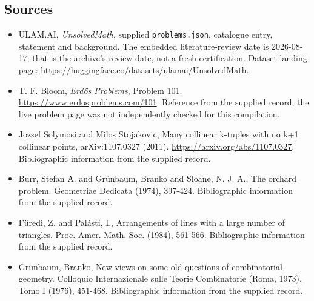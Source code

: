\documentclass[11pt,a4paper]{article}
\begin{document}
\subsection{Sources}

{\small

\begin{itemize}

\item[\hypertarget{source:statement:1}{S1}] ULAM.AI, \emph{UnsolvedMath}, supplied \texttt{problems.json}, catalogue entry, statement and background. The embedded literature-review date is 2026-08-17; that is the archive’s review date, not a fresh certification. Dataset landing page: \url{https://huggingface.co/datasets/ulamai/UnsolvedMath}.

\item[\hypertarget{source:statement:2}{S2}] T. F. Bloom, \emph{Erdős Problems}, Problem 101, \url{https://www.erdosproblems.com/101}. Reference from the supplied record; the live problem page was not independently checked for this compilation.

\item[\hypertarget{source:statement:3}{S3}] Jozsef Solymosi and Milos Stojakovic, Many collinear k-tuples with no k+1 collinear points, arXiv:1107.0327 (2011). \url{https://arxiv.org/abs/1107.0327}. Bibliographic information from the supplied record.

\item[\hypertarget{source:statement:4}{S4}] Burr, Stefan A. and Gr\"{u}nbaum, Branko and Sloane, N. J. A., The orchard problem. Geometriae Dedicata (1974), 397-424. Bibliographic information from the supplied record.

\item[\hypertarget{source:statement:5}{S5}] F\"{u}redi, Z. and Pal\'{a}sti, I., Arrangements of lines with a large number of triangles. Proc. Amer. Math. Soc. (1984), 561-566. Bibliographic information from the supplied record.

\item[\hypertarget{source:statement:6}{S6}] Gr\"{u}nbaum, Branko, New views on some old questions of combinatorial geometry. Colloquio Internazionale sulle Teorie Combinatorie (Roma, 1973), Tomo I (1976), 451-468. Bibliographic information from the supplied record.

\end{itemize}

}

\label{end:statement}
\end{document}
